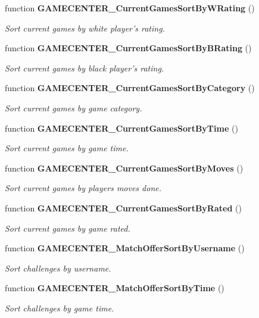 \begin{CompactItemize}
function {\bf GAMECENTER\_\-CurrentGamesSortByWRating} ()
\begin{CompactList}\small\item\em Sort current games by white player's rating. \item\end{CompactList}\item 
function {\bf GAMECENTER\_\-CurrentGamesSortByBRating} ()
\begin{CompactList}\small\item\em Sort current games by black player's rating. \item\end{CompactList}\item 
function {\bf GAMECENTER\_\-CurrentGamesSortByCategory} ()
\begin{CompactList}\small\item\em Sort current games by game category. \item\end{CompactList}\item 
function {\bf GAMECENTER\_\-CurrentGamesSortByTime} ()
\begin{CompactList}\small\item\em Sort current games by game time. \item\end{CompactList}\item 
function {\bf GAMECENTER\_\-CurrentGamesSortByMoves} ()
\begin{CompactList}\small\item\em Sort current games by players moves done. \item\end{CompactList}\item 
function {\bf GAMECENTER\_\-CurrentGamesSortByRated} ()
\begin{CompactList}\small\item\em Sort current games by game rated. \item\end{CompactList}\item 
function {\bf GAMECENTER\_\-MatchOfferSortByUsername} ()
\begin{CompactList}\small\item\em Sort challenges by username. \item\end{CompactList}\item 
function {\bf GAMECENTER\_\-MatchOfferSortByTime} ()
\begin{CompactList}\small\item\em Sort challenges by game time. \item\end{CompactList}\item 

\end{CompactItemize}
